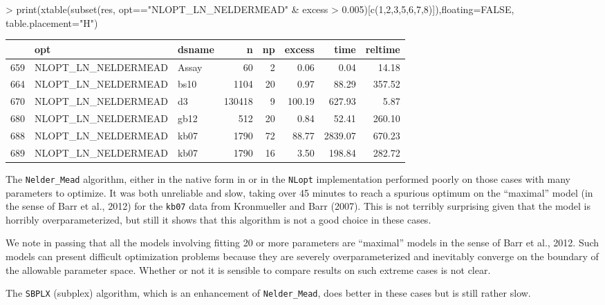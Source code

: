 \documentclass[article]{jss}
\begin{document}
\begin{Schunk}
\begin{Sinput}
> print(xtable(subset(res, opt=="NLOPT_LN_NELDERMEAD" & excess > 0.005)[c(1,2,3,5,6,7,8)]),floating=FALSE, table.placement="H")
\end{Sinput}
\begin{tabular}{rllrrrrr}
  \hline
 & opt & dsname & n & np & excess & time & reltime \\ 
  \hline
659 & NLOPT\_LN\_NELDERMEAD & Assay &  60 &   2 & 0.06 & 0.04 & 14.18 \\ 
  664 & NLOPT\_LN\_NELDERMEAD & bs10 & 1104 &  20 & 0.97 & 88.29 & 357.52 \\ 
  670 & NLOPT\_LN\_NELDERMEAD & d3 & 130418 &   9 & 100.19 & 627.93 & 5.87 \\ 
  680 & NLOPT\_LN\_NELDERMEAD & gb12 & 512 &  20 & 0.84 & 52.41 & 260.10 \\ 
  688 & NLOPT\_LN\_NELDERMEAD & kb07 & 1790 &  72 & 88.77 & 2839.07 & 670.23 \\ 
  689 & NLOPT\_LN\_NELDERMEAD & kb07 & 1790 &  16 & 3.50 & 198.84 & 282.72 \\ 
   \hline
\end{tabular}\end{Schunk}




 The \texttt{Nelder\_Mead} algorithm, either in the native form in
 or in the \texttt{NLopt} implementation performed poorly
on those cases with many parameters to optimize. It was both unreliable
and slow, taking over 45 minutes to reach a spurious optimum on the
``maximal'' model (in the sense of Barr et al., 2012) for the
\texttt{kb07} data from Kronmueller and Barr (2007). This is not
terribly surprising given that the model is horribly overparameterized,
but still it shows that this algorithm is not a good choice in these
cases.

We note in passing that all the models involving fitting 20 or more
parameters are ``maximal'' models in the sense of Barr et al., 2012.
Such models can present difficult optimization problems because they are
severely overparameterized and inevitably converge on the boundary of
the allowable parameter space. Whether or not it is sensible to compare
results on such extreme cases is not clear.

The \texttt{SBPLX} (subplex) algorithm, which is an enhancement of
\texttt{Nelder\_Mead}, does better in these cases but is still rather
slow.
\end{document}
